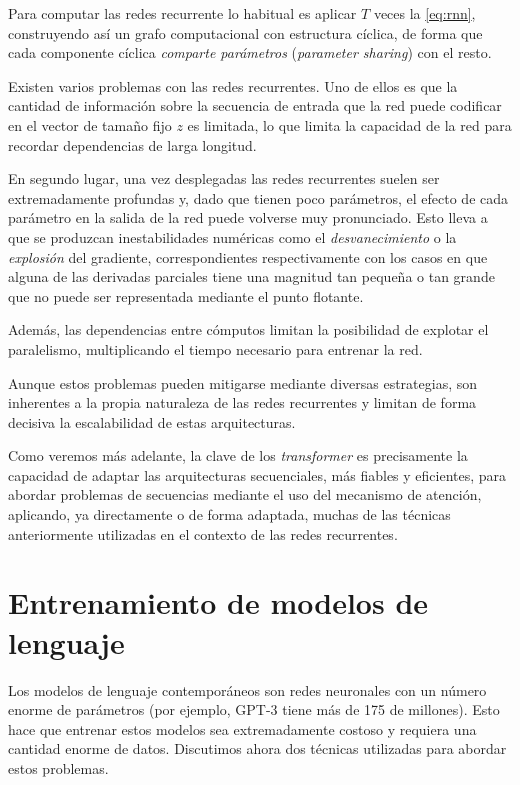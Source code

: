 Para computar las redes recurrente lo habitual es aplicar \( T \) veces la \cref{eq:rnn}, construyendo así un grafo computacional con estructura cíclica, de forma que cada componente cíclica \textit{comparte parámetros} (\textit{parameter sharing}) con el resto. 

Existen varios problemas con las redes recurrentes. Uno de ellos es que la cantidad de información sobre la secuencia de entrada que la red puede codificar en el vector de tamaño fijo \( z \) es limitada, lo que limita la capacidad de la red para recordar dependencias de larga longitud. 

En segundo lugar, una vez desplegadas las redes recurrentes suelen ser extremadamente profundas y, dado que tienen poco parámetros, el efecto de cada parámetro en la salida de la red puede volverse muy pronunciado. Esto lleva a que se produzcan inestabilidades numéricas como el \textit{desvanecimiento} o la \textit{explosión} del gradiente, correspondientes respectivamente con los casos en que alguna de las derivadas parciales tiene una magnitud tan pequeña o tan grande que no puede ser representada mediante el punto flotante. 

Además, las dependencias entre cómputos limitan la posibilidad de explotar el paralelismo, multiplicando el tiempo necesario para entrenar la red.

Aunque estos problemas pueden mitigarse mediante diversas estrategias, son inherentes a la propia naturaleza de las redes recurrentes y limitan de forma decisiva la escalabilidad de estas arquitecturas. 

Como veremos más adelante, la clave de los \textit{transformer} es precisamente la capacidad de adaptar las arquitecturas secuenciales, más fiables y eficientes, para abordar problemas de secuencias mediante el uso del mecanismo de atención, aplicando, ya directamente o de forma adaptada, muchas de las técnicas anteriormente utilizadas en el contexto de las redes recurrentes. 

\section{Entrenamiento de modelos de lenguaje}
Los modelos de lenguaje contemporáneos son redes neuronales con un número enorme de parámetros (por ejemplo, GPT-3 tiene más de 175 de millones). Esto hace que entrenar estos modelos sea extremadamente costoso y requiera una cantidad enorme de datos. Discutimos ahora dos técnicas utilizadas para abordar estos problemas. 

